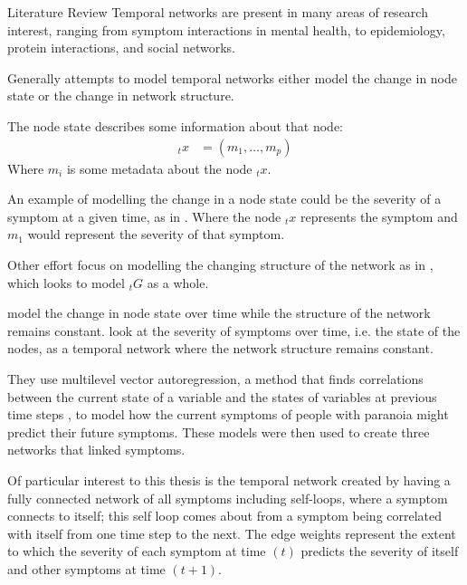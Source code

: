 \documentclass[12pt]{amsart}
\begin{document}
\begin{section}{Literature Review}
        Temporal networks are present in many areas of research interest, ranging from symptom interactions in mental health\cite{jordan2020current,contreras2020temporal}, to epidemiology\cite{masuda2013predicting}, protein interactions\cite{lucas2021inferring,jin2009identifying}, and social networks\cite{moinet2015burstiness,hanneke2010discrete}.     
        
        Generally attempts to model temporal networks either model the change in node state or the change in network structure.
        
        The node state describes some information about that node:
        \begin{align}
            _t x &= (m_1,\ldots, m_p)
        \end{align}
        Where $m_i$ is some metadata about the node $_t x$.

        An example of modelling the change in a node state could be the severity of a symptom at a given time, as in \cite{contreras2020temporal}. Where the node $_t x$ represents the symptom and $m_1$ would represent the severity of that symptom. 
        
        Other effort focus on modelling the changing structure of the network as in \cite{sanna2021link}, which looks to model $_t G$ as a whole.

        \cite{contreras2020temporal} model the change in node state over time while the structure of the network remains constant.  look at the severity of symptoms over time, i.e. the state of the nodes, as a temporal network where the network structure remains constant. 
        
        They use multilevel vector autoregression, a method that finds correlations between the current state of a variable and the states of variables at previous time steps \cite{singer2003applied}, to model how the current symptoms of people with paranoia might predict their future symptoms. These models were then used to create three networks that linked symptoms. 
        
        Of particular interest to this thesis is the temporal network created by having a fully connected network of all symptoms including self-loops, where a symptom connects to itself; this self loop comes about from a symptom being correlated with itself from one time step to the next. The edge weights represent the extent to which the severity of each symptom at time $(t)$ predicts the severity of itself and other symptoms at time $(t+1)$. 
        

\end{section}
\end{document}
